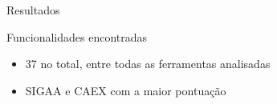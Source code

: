 \begin{frame}{{\sffamily Resultados}}
    \begin{block}{Funcionalidades encontradas}
    \begin{itemize}
        \item 37 no total, entre todas as ferramentas analisadas
        \item SIGAA e CAEX com a maior pontuação
    \end{itemize}
\end{block}

    
\end{frame}
